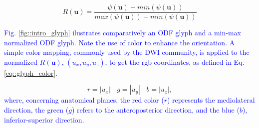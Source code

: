 \documentclass[twoside,twocolumn,10pt]{article}
\begin{document}


\begin{equation}
\label{eq::normglifo}
    R(\bm{u}) = \frac{\psi(\bm{u}) - min(\psi(\bm{u}))}{max(\psi(\bm{u})) - min(\psi(\bm{u}))}
\end{equation}

\textcolor{blue}{Fig. \ref{fig::intro_glyph} ilustrates comparatively an ODF glyph and a min-max normalized ODF glyph. Note the use of color to enhance the orientation. A simple color mapping, commonly used by the DWI community, is applied to the normalized  $R(\bm{u})$, $(u_x, u_y, u_z)$, to get the rgb coordinates, as defined in Eq. \ref{eq::glyph_color}.}

\begin{equation}
\label{eq::glyph_color}
    r = |u_x| ~~~~ g = |u_y| ~~~~ b = |u_z|, 
\end{equation}
\textcolor{blue}{where, concerning anatomical planes, the red color ($r$) represents the mediolateral direction, the green ($g$) refers to the anteroposterior direction, and the blue ($b$), inferior-superior direction.}
\end{document}
